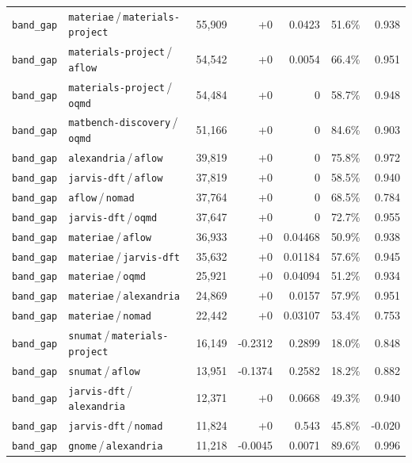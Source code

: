 \begin{longtable}{llrrrrr}
\texttt{band\_gap} & \texttt{materiae}\,/\,\texttt{materials-project} & 55{,}909 & +0 & 0.0423 & 51.6\% & 0.938 \\
\texttt{band\_gap} & \texttt{materials-project}\,/\,\texttt{aflow} & 54{,}542 & +0 & 0.0054 & 66.4\% & 0.951 \\
\texttt{band\_gap} & \texttt{materials-project}\,/\,\texttt{oqmd} & 54{,}484 & +0 & 0 & 58.7\% & 0.948 \\
\texttt{band\_gap} & \texttt{matbench-discovery}\,/\,\texttt{oqmd} & 51{,}166 & +0 & 0 & 84.6\% & 0.903 \\
\texttt{band\_gap} & \texttt{alexandria}\,/\,\texttt{aflow} & 39{,}819 & +0 & 0 & 75.8\% & 0.972 \\
\texttt{band\_gap} & \texttt{jarvis-dft}\,/\,\texttt{aflow} & 37{,}819 & +0 & 0 & 58.5\% & 0.940 \\
\texttt{band\_gap} & \texttt{aflow}\,/\,\texttt{nomad} & 37{,}764 & +0 & 0 & 68.5\% & 0.784 \\
\texttt{band\_gap} & \texttt{jarvis-dft}\,/\,\texttt{oqmd} & 37{,}647 & +0 & 0 & 72.7\% & 0.955 \\
\texttt{band\_gap} & \texttt{materiae}\,/\,\texttt{aflow} & 36{,}933 & +0 & 0.04468 & 50.9\% & 0.938 \\
\texttt{band\_gap} & \texttt{materiae}\,/\,\texttt{jarvis-dft} & 35{,}632 & +0 & 0.01184 & 57.6\% & 0.945 \\
\texttt{band\_gap} & \texttt{materiae}\,/\,\texttt{oqmd} & 25{,}921 & +0 & 0.04094 & 51.2\% & 0.934 \\
\texttt{band\_gap} & \texttt{materiae}\,/\,\texttt{alexandria} & 24{,}869 & +0 & 0.0157 & 57.9\% & 0.951 \\
\texttt{band\_gap} & \texttt{materiae}\,/\,\texttt{nomad} & 22{,}442 & +0 & 0.03107 & 53.4\% & 0.753 \\
\texttt{band\_gap} & \texttt{snumat}\,/\,\texttt{materials-project} & 16{,}149 & -0.2312 & 0.2899 & 18.0\% & 0.848 \\
\texttt{band\_gap} & \texttt{snumat}\,/\,\texttt{aflow} & 13{,}951 & -0.1374 & 0.2582 & 18.2\% & 0.882 \\
\texttt{band\_gap} & \texttt{jarvis-dft}\,/\,\texttt{alexandria} & 12{,}371 & +0 & 0.0668 & 49.3\% & 0.940 \\
\texttt{band\_gap} & \texttt{jarvis-dft}\,/\,\texttt{nomad} & 11{,}824 & +0 & 0.543 & 45.8\% & -0.020 \\
\texttt{band\_gap} & \texttt{gnome}\,/\,\texttt{alexandria} & 11{,}218 & -0.0045 & 0.0071 & 89.6\% & 0.996 \\

\end{longtable}
